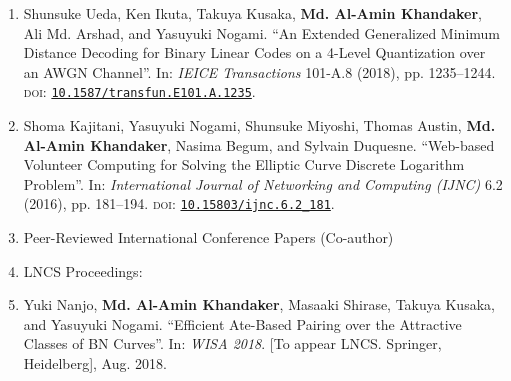 \begin{enumerate}
	\item Shunsuke Ueda, Ken Ikuta, Takuya Kusaka, \textbf{Md. Al-Amin Khandaker}, Ali Md. Arshad, and Yasuyuki Nogami. ``An Extended Generalized Minimum Distance Decoding for Binary Linear Codes on a 4-Level Quantization over an AWGN Channel”. In: \textit{IEICE Transactions} 101-A.8 (2018), pp. 1235–1244. \textsc{doi}: \href{https://doi.org/10.1587/transfun.E101.A.1235}{\texttt{10.1587/transfun.E101.A.1235}}.
	
	\item Shoma Kajitani, Yasuyuki Nogami, Shunsuke Miyoshi, Thomas Austin, \textbf{Md. Al-Amin Khandaker}, Nasima Begum, and Sylvain Duquesne. “Web-based Volunteer Computing for Solving the Elliptic Curve Discrete Logarithm Problem”. In: \textit{International Journal of Networking and Computing (IJNC) }6.2 (2016), pp. 181–194. \textsc{doi}: \href{https://doi.org/10.15803/ijnc.6.2_181}{\texttt{10.15803/ijnc.6.2\_181}}.
	
\vspace{10mm}
	\Large
	\item[] Peer-Reviewed International Conference Papers  (Co-author)
	\item[ ] \Large LNCS Proceedings:
	\normalsize
	\item Yuki Nanjo, \textbf{Md. Al-Amin Khandaker}, Masaaki Shirase, Takuya Kusaka, and Yasuyuki Nogami. ``Efficient Ate-Based Pairing over the Attractive Classes of BN Curves''. In: \textit{WISA 2018}. [To appear LNCS. Springer, Heidelberg],  Aug. 2018.
	
	

\end{enumerate}
